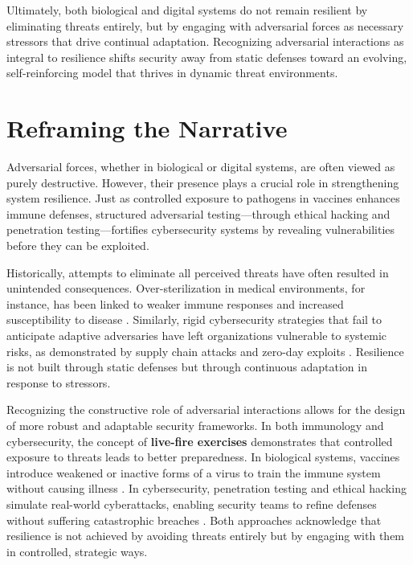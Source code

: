 \documentclass{article}
\begin{document}
Ultimately, both biological and digital systems do not remain resilient by eliminating threats entirely, but by engaging with adversarial forces as necessary stressors that drive continual adaptation. Recognizing adversarial interactions as integral to resilience shifts security away from static defenses toward an evolving, self-reinforcing model that thrives in dynamic threat environments.

\section{Reframing the Narrative}
Adversarial forces, whether in biological or digital systems, are often viewed as purely destructive. However, their presence plays a crucial role in strengthening system resilience. Just as controlled exposure to pathogens in vaccines enhances immune defenses, structured adversarial testing—through ethical hacking and penetration testing—fortifies cybersecurity systems by revealing vulnerabilities before they can be exploited.

Historically, attempts to eliminate all perceived threats have often resulted in unintended consequences. Over-sterilization in medical environments, for instance, has been linked to weaker immune responses and increased susceptibility to disease \citep{schmid2014antigenic}. Similarly, rigid cybersecurity strategies that fail to anticipate adaptive adversaries have left organizations vulnerable to systemic risks, as demonstrated by supply chain attacks and zero-day exploits \citep{cisa2022supply}. Resilience is not built through static defenses but through continuous adaptation in response to stressors.

Recognizing the constructive role of adversarial interactions allows for the design of more robust and adaptable security frameworks. In both immunology and cybersecurity, the concept of \textbf{live-fire exercises} demonstrates that controlled exposure to threats leads to better preparedness. In biological systems, vaccines introduce weakened or inactive forms of a virus to train the immune system without causing illness \citep{morens2020emerging}. In cybersecurity, penetration testing and ethical hacking simulate real-world cyberattacks, enabling security teams to refine defenses without suffering catastrophic breaches \citep{shostack2014threatmodeling}. Both approaches acknowledge that resilience is not achieved by avoiding threats entirely but by engaging with them in controlled, strategic ways.
\end{document}

